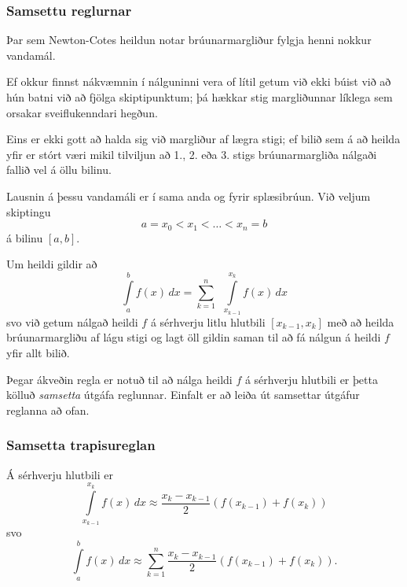 \documentclass[icelandic,a4paper,12pt]{article}
\begin{document}
\subsubsection{Samsettu reglurnar} 
Þar sem Newton-Cotes heildun notar brúunarmargliður fylgja henni
nokkur vandamál. 

\pause
\smallskip
Ef okkur finnst nákvæmnin í nálguninni vera of lítil
getum við ekki búist við að hún batni við að fjölga skiptipunktum; þá
hækkar stig margliðunnar líklega sem orsakar sveiflukenndari
hegðun. 

\pause
\smallskip
Eins er ekki gott að halda sig við margliður af lægra stigi;
ef bilið sem á að heilda yfir er stórt væri mikil tilviljun að 1.,
2. eða 3. stigs brúunarmargliða nálgaði fallið vel á öllu bilinu. 



Lausnin á þessu vandamáli er í sama anda og fyrir splæsibrúun. \pause
Við veljum skiptingu 
\begin{equation*}
  a  =x_0 < x_1 < \ldots < x_n = b
\end{equation*}
á bilinu $[a,b]$. 

\pause
\smallskip
Um heildi gildir að
\begin{equation*}
  \int\limits_a^bf(x)\, dx = \sum\limits_{k=1}^n \ \ \int\limits_{x_{k-1}}^{x_k} f(x) \, dx
\end{equation*}
svo við getum nálgað heildi $f$ á sérhverju litlu hlutbili
$[x_{k-1},x_k]$ með að heilda brúunarmargliðu af lágu stigi og lagt
öll gildin saman til að fá nálgun á heildi $f$ yfir allt bilið. 

\pause
\smallskip
Þegar ákveðin regla er notuð til að nálga heildi $f$ á sérhverju
hlutbili er þetta kölluð {\it samsetta} útgáfa reglunnar. Einfalt er að leiða
út samsettar útgáfur reglanna að ofan. 



\subsubsection{Samsetta trapisureglan} 
Á sérhverju hlutbili er
\begin{equation*}
  \int\limits_{x_{k-1}}^{x_k} f(x) \, dx
  \approx
  \frac{x_k-x_{k-1}}{2}(f(x_{k-1}) + f(x_k))
\end{equation*}
svo
\begin{equation*}
  \int\limits_a^b f(x) \, dx
  \approx
  \sum\limits_{k=1}^n \frac{x_k-x_{k-1}}{2}(f(x_{k-1}) + f(x_k)).
\end{equation*}
\end{document}
